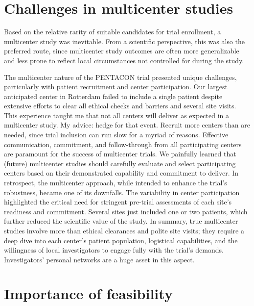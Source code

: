 \documentclass[authordate, reflection]{jote-new-article}
\begin{document}
	\section{Challenges in multicenter studies}



	Based on the relative rarity of suitable candidates for trial enrollment, a multicenter study was inevitable. From a scientific perspective, this was also the preferred route, since multicenter study outcomes are often more generalizable and less prone to reflect local circumstances not controlled for during the study.



	The multicenter nature of the PENTACON trial presented unique challenges, particularly with patient recruitment and center participation. Our largest anticipated center in Rotterdam failed to include a single patient despite extensive efforts to clear all ethical checks and barriers and several site visits. This experience taught me that not all centers will deliver as expected in a multicenter study. My advice: hedge for that event. Recruit more centers than are needed, since trial inclusion can run slow for a myriad of reasons. Effective communication, commitment, and follow-through from all participating centers are paramount for the success of multicenter trials. We painfully learned that (future) multicenter studies should carefully evaluate and select participating centers based on their demonstrated capability and commitment to deliver. In retrospect, the multicenter approach, while intended to enhance the trial's robustness, became one of its downfalls. The variability in center participation highlighted the critical need for stringent pre-trial assessments of each site's readiness and commitment. Several sites just included one or two patients, which further reduced the scientific value of the study. In summary, true multicenter studies involve more than ethical clearances and polite site visits; they require a deep dive into each center's patient population, logistical capabilities, and the willingness of local investigators to engage fully with the trial's demands. Investigators' personal networks are a huge asset in this aspect.



	\section{Importance of feasibility }
\end{document}
